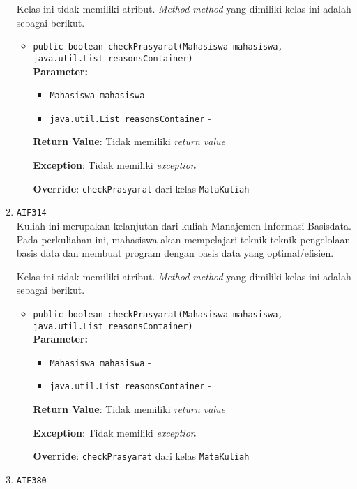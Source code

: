 \documentclass{article}
\begin{document}
\begin{enumerate}
Kelas ini tidak memiliki atribut. \textit{Method-method} yang dimiliki kelas ini adalah sebagai berikut.
\begin{itemize}
\item \texttt{public boolean checkPrasyarat(Mahasiswa mahasiswa, java.util.List reasonsContainer)}\\ 


\textbf{Parameter:}\begin{itemize}
\item \texttt{Mahasiswa mahasiswa} - 
\item \texttt{java.util.List reasonsContainer} - 
\end{itemize}
\textbf{Return Value}: Tidak memiliki \textit{return value}

\textbf{Exception}: Tidak memiliki \textit{exception}

\textbf{Override}: \texttt{checkPrasyarat} dari kelas \texttt{MataKuliah}

\end{itemize}
\item \texttt{AIF314}\\ 
Kuliah ini merupakan kelanjutan dari kuliah Manajemen Informasi Basisdata.
 Pada perkuliahan ini, mahasiswa akan mempelajari teknik-teknik pengelolaan
 basis data dan membuat program dengan basis data yang optimal/efisien.

Kelas ini tidak memiliki atribut. \textit{Method-method} yang dimiliki kelas ini adalah sebagai berikut.
\begin{itemize}
\item \texttt{public boolean checkPrasyarat(Mahasiswa mahasiswa, java.util.List reasonsContainer)}\\ 


\textbf{Parameter:}\begin{itemize}
\item \texttt{Mahasiswa mahasiswa} - 
\item \texttt{java.util.List reasonsContainer} - 
\end{itemize}
\textbf{Return Value}: Tidak memiliki \textit{return value}

\textbf{Exception}: Tidak memiliki \textit{exception}

\textbf{Override}: \texttt{checkPrasyarat} dari kelas \texttt{MataKuliah}

\end{itemize}
\item \texttt{AIF380}\\ 



\end{enumerate}
\end{document}
